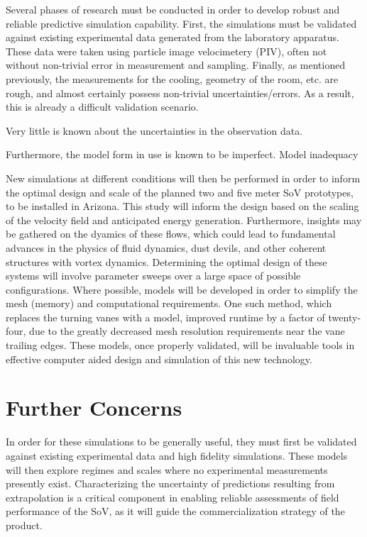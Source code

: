 \documentclass{article}
\begin{document}
Several phases of research must be conducted in order to develop robust
and reliable predictive simulation capability. First, the simulations
must be validated against existing experimental data generated from the
laboratory apparatus. These data were taken using particle image
velocimetery (PIV), often not without non-trivial error in measurement and
sampling. Finally, as mentioned previously, the measurements for the
cooling, geometry of the room, etc. are rough, and almost certainly
possess non-trivial uncertainties/errors. As a result, this is already a
difficult validation scenario. 

Very little is known about the uncertainties in the observation data. 

Furthermore, the model form in use is known to be imperfect. 
Model inadequacy



New simulations at different conditions will then be performed in order
to inform the optimal design and scale of the planned two and five meter
SoV prototypes, to be installed in Arizona. This study will inform the
design based on the scaling 
of the velocity field and anticipated energy generation. Furthermore,
insights may be gathered on the dyamics of these flows, which could lead
to fundamental advances in the physics of fluid dynamics, dust devils,
and other coherent structures with vortex
dynamics\cite{Mullen1977181,smithleslie,kanak}. Determining the optimal
design of 
these systems will involve parameter sweeps over a large space of
possible configurations. Where possible, models will be developed in
order to simplify the mesh (memory) and computational requirements. One
such method, which replaces the turning vanes with a model, improved
runtime by a factor of twenty-four, due to the greatly decreased
mesh resolution requirements near the vane trailing edges. These models,
once properly validated, will be invaluable tools in effective computer
aided design and simulation of this new technology. 


%
%
\section{Further Concerns}

In order for these simulations to be generally useful, they must first
be validated against existing experimental data and high fidelity
simulations. These models will then explore regimes and scales where no
experimental measurements presently exist. Characterizing the
uncertainty of predictions resulting from extrapolation is a critical
component in enabling reliable assessments of field performance of the
SoV, as it will guide the commercialization strategy of the product.
\end{document}
